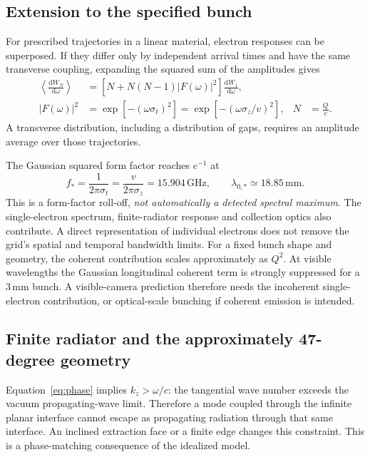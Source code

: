 \documentclass[11pt,a4paper]{article}
\newcommand{\dd}{\mathrm d}
\newcommand{\unit}[1]{\,\mathrm{#1}}
\numberwithin{equation}{section}
\begin{document}
\subsection{Extension to the specified bunch}

For prescribed trajectories in a linear material, electron responses can
be superposed. If they differ only by independent arrival times and have
the same transverse coupling, expanding the squared sum of the amplitudes gives
\begin{align}
 \left\langle\frac{\dd W_N}{\dd\omega}\right\rangle
   &=\left[N+N(N-1)|F(\omega)|^2\right]
      \frac{\dd W_1}{\dd\omega}, \label{eq:bunch}\\
 |F(\omega)|^2&=\exp[-(\omega\sigma_t)^2]
              =\exp[-(\omega\sigma_z/v)^2],&
 N&=\frac{Q}{e}. \label{eq:formfactor}
\end{align}
A transverse distribution, including a distribution of gaps, requires
an amplitude average over those trajectories.

The Gaussian squared form factor reaches \(e^{-1}\) at
\begin{equation}
 f_*=\frac{1}{2\pi\sigma_t}=\frac{v}{2\pi\sigma_z}=15.904\unit{GHz},
 \qquad \lambda_{0,*}\simeq18.85\unit{mm}.
\end{equation}
This is a form-factor roll-off, \emph{not automatically a detected spectral
maximum}. The single-electron spectrum, finite-radiator response and
collection optics also contribute. A direct representation of individual
electrons does not remove the grid's spatial and temporal bandwidth limits.
For a fixed bunch shape and geometry, the coherent contribution scales
approximately as \(Q^2\). At visible wavelengths the Gaussian longitudinal
coherent term is strongly suppressed for a \(3\unit{mm}\) bunch. A visible-camera
prediction therefore needs the incoherent single-electron contribution,
or optical-scale bunching if coherent emission is intended.

\subsection{Finite radiator and the approximately 47-degree geometry}

Equation~\eqref{eq:phase} implies \(k_z>\omega/c\): the tangential wave
number exceeds the vacuum propagating-wave limit. Therefore a mode
coupled through the infinite planar interface cannot escape as propagating
radiation through that same interface. An inclined extraction face or a
finite edge changes this constraint. This is a phase-matching consequence
of the idealized model.
\end{document}

